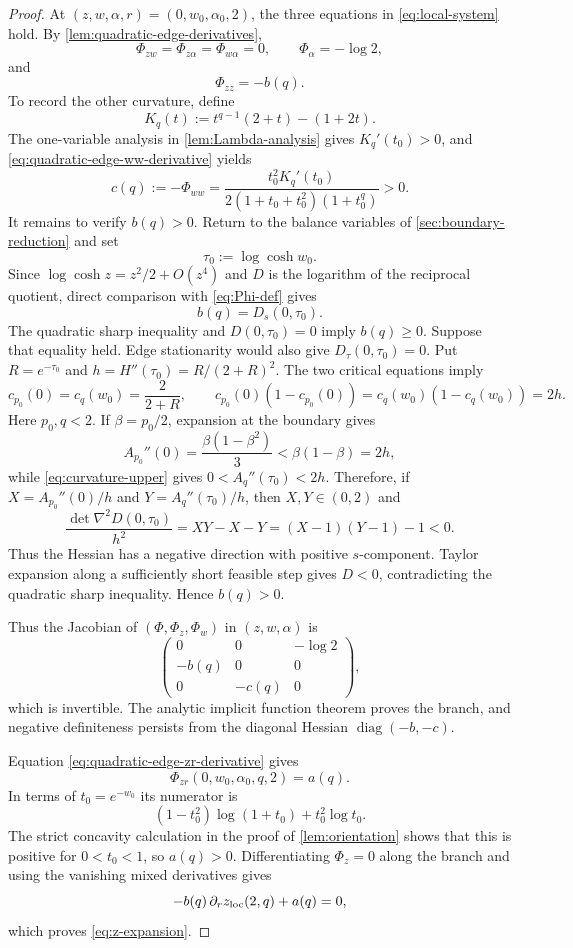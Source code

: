 \documentclass[11pt,reqno]{amsart}
\numberwithin{equation}{section}
\theoremstyle{definition}
\theoremstyle{remark}
\begin{document}
\begin{proof}
At $(z,w,\alpha,r)=(0,w_0,\alpha_0,2)$, the three equations in
\eqref{eq:local-system} hold.  By
\cref{lem:quadratic-edge-derivatives},
\[
  \Phi_{zw}=\Phi_{z\alpha}=\Phi_{w\alpha}=0,
  \qquad
  \Phi_{\alpha}=-\log2,
\]
and
\[
  \Phi_{zz}=-b(q).
\]
To record the other curvature, define
\[
  K_q(t):=t^{q-1}(2+t)-(1+2t).
\]
The one-variable analysis in \cref{lem:Lambda-analysis} gives
$K_q'(t_0)>0$, and \eqref{eq:quadratic-edge-ww-derivative} yields
\begin{equation}\label{eq:c-def}
  c(q):=-\Phi_{ww}
  =\frac{t_0^2K_q'(t_0)}
  {2(1+t_0+t_0^2)(1+t_0^q)}>0.
\end{equation}
It remains to verify $b(q)>0$.  Return to the balance variables of
\cref{sec:boundary-reduction} and set
\[
  \tau_0:=\log\cosh w_0.
\]
Since $\log\cosh z=z^2/2+O(z^4)$ and $D$ is the logarithm of the reciprocal
quotient, direct comparison with \eqref{eq:Phi-def} gives
\[
  b(q)=D_s(0,\tau_0).
\]
The quadratic sharp inequality and $D(0,\tau_0)=0$ imply $b(q)\ge0$.  Suppose
that equality held.  Edge stationarity would also give
$D_\tau(0,\tau_0)=0$.  Put $R=e^{-\tau_0}$ and
$h=H''(\tau_0)=R/(2+R)^2$.  The two critical equations imply
\[
  c_{p_0}(0)=c_q(w_0)=\frac2{2+R},
  \qquad c_{p_0}(0)(1-c_{p_0}(0))
  =c_q(w_0)(1-c_q(w_0))=2h.
\]
Here $p_0,q<2$.  If $\beta=p_0/2$, expansion at the boundary gives
\[
  A_{p_0}''(0)=\frac{\beta(1-\beta^2)}3
  <\beta(1-\beta)=2h,
\]
while \eqref{eq:curvature-upper} gives $0<A_q''(\tau_0)<2h$.  Therefore, if
$X=A_{p_0}''(0)/h$ and $Y=A_q''(\tau_0)/h$, then $X,Y\in(0,2)$ and
\[
  \frac{\det\nabla^2D(0,\tau_0)}{h^2}
  =XY-X-Y=(X-1)(Y-1)-1<0.
\]
Thus the Hessian has a negative direction with positive $s$-component.
Taylor expansion along a sufficiently short feasible step gives $D<0$,
contradicting the quadratic sharp inequality.  Hence $b(q)>0$.

Thus the Jacobian of $(\Phi,\Phi_z,\Phi_w)$ in $(z,w,\alpha)$ is
\begin{equation}\label{eq:ift-jacobian}
  \begin{pmatrix}
    0&0&-\log2\\
    -b(q)&0&0\\
    0&-c(q)&0
  \end{pmatrix},
\end{equation}
which is invertible.  The analytic implicit function theorem proves the branch,
and negative definiteness persists from the diagonal Hessian
$\operatorname{diag}(-b,-c)$.

Equation \eqref{eq:quadratic-edge-zr-derivative} gives
\[
  \Phi_{zr}(0,w_0,\alpha_0,q,2)=a(q).
\]
In terms of $t_0=e^{-w_0}$ its numerator is
\[
  (1-t_0^2)\log(1+t_0)+t_0^2\log t_0.
\]
The strict concavity calculation in the proof of
\cref{lem:orientation} shows that this is positive for $0<t_0<1$, so
$a(q)>0$.  Differentiating
$\Phi_z=0$ along the branch and using the vanishing mixed derivatives gives
\[
  -b(q)\,\partial_r z_{\rm loc}(2,q)+a(q)=0,
\]
which proves \eqref{eq:z-expansion}.


\end{proof}
\end{document}
